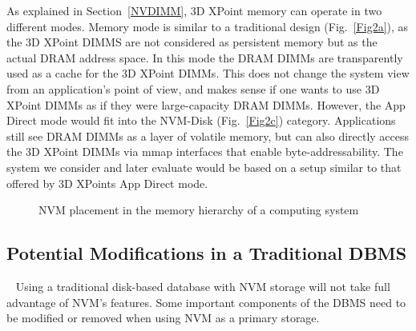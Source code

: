 As explained in Section~\ref{NVDIMM}, 3D XPoint memory can operate in two different modes. Memory mode is similar to a traditional design (Fig.~\ref{Fig2a}), as the 3D XPoint DIMMS are not considered as persistent memory but as the actual DRAM address space. In this mode the DRAM DIMMs are transparently used as a cache for the 3D XPoint DIMMs. This does not change the system view from an application's point of view, and makes sense if one wants to use 3D XPoint DIMMs as if they were large-capacity DRAM DIMMs. However, the App Direct mode would fit into the NVM-Disk (Fig.~\ref{Fig2c}) category. Applications still see DRAM DIMMs as a layer of volatile memory, but can also directly access the 3D XPoint DIMMs via mmap interfaces that enable byte-addressability. The system we consider and later evaluate would be based on a setup similar to that offered by 3D XPoint\textquotesingle s  App Direct mode.



\begin{figure} %
\centering     %
{}
\caption{NVM placement in the memory hierarchy of a computing system}
\label{Fig2}
\end{figure}


\subsection{Potential Modifications in a Traditional DBMS}~\label{modList}
Using a traditional disk-based database with NVM storage will not take full advantage of NVM's features. Some important components of the DBMS need to be modified or removed when using NVM as a primary storage. 

